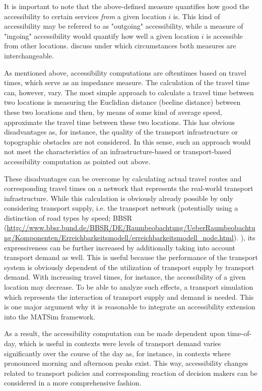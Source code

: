 It is important to note that the above-defined measure quantifies how good the accessibility to certain services \textit{from} a given location $i$ is. This kind of accessibility may be referred to as "outgoing" accessibility, while a measure of "ingoing" accessibility would quantify how well a given location $i$ is accessible from other locations. \citet{NicolaiNagel2012HiResAccessibilityMethodInBook} discuss under which circumstances both measures are interchangeable.

As mentioned above, accessibility computations are oftentimes based on travel times, which serve as an impedance measure. The calculation of the travel time can, however, vary. The most simple approach to calculate a travel time between two locations is measuring the Euclidian distance (beeline distance) between these two locations and then, by means of some kind of average speed, approximate the travel time between these two locations. This has obvious disadvantages as, for instance, the quality of the transport infrastructure or topographic obstacles are not considered. In this sense, such an approach would not meet the characteristics of an {in\-fra\-struc\-ture-based} or transport-based accessibility computation as pointed out above.

These disadvantages can be overcome by calculating actual travel routes and corresponding travel times on a network that represents the real-world transport infrastructure. While this calculation is obviously already possible by only considering transport supply, i.e. the transport network (potentially using a distinction of road types by speed; \eg BBSR (\url{http://www.bbsr.bund.de/BBSR/DE/Raumbeobachtung/UeberRaumbeobachtung/Komponenten/Erreichbarkeitsmodell/erreichbarkeitsmodell_node.html}). ), its expressiveness can be further increased by additionally taking into account transport demand as well. This is useful because the performance of the transport system is obviously dependent of the utilization of transport supply by transport demand. With increasing travel times, for instance, the accessibility of a given location may decrease. To be able to analyze such effects, a transport simulation which represents the interaction of transport supply and demand is needed. This is one major argument why it is reasonable to integrate an accessibility extension into the MATSim framework.

As a result, the accessibility computation can be made dependent upon time-of-day, which is useful in contexts were levels of transport demand varies significantly over the course of the day as, for instance, in contexts where pronounced morning and afternoon peaks exist. This way, accessibility changes related to transport policies and corresponding reaction of decision makers can be considered in a more comprehensive fashion.

